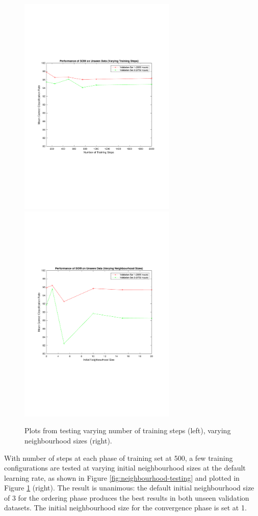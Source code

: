 \documentclass[10pt, oneside]{article}
\begin{document}
\begin{figure}[h]
\begin{center}
\includegraphics[width=7.5cm]{steps-plot.pdf} \includegraphics[width=7.5cm]{neighbourhood-plot.pdf}
\end{center}
\caption{\label{fig:testing-plots} Plots from testing varying number of training steps (left), varying neighbourhood sizes (right).}
\end{figure}

With number of steps at each phase of training set at 500, a few training configurations are tested at varying initial neighbourhood sizes at the default learning rate, as shown in Figure \ref{fig:neighbourhood-testing} and plotted in Figure \ref{fig:testing-plots} (right). The result is unanimous: the default initial neighbourhood size of 3 for the ordering phase produces the best results in both unseen validation datasets. The initial neighbourhood size for the convergence phase is set at 1.
\end{document}
